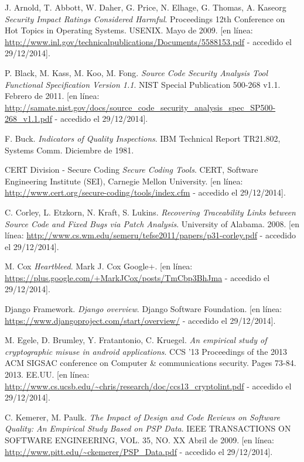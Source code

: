 \documentclass[11pt,a4paper]{article}
\begin{document}
\begin{thebibliography}{99}

	J. Arnold, T. Abbott, W. Daher, G. Price, N. Elhage, G. Thomas, A. Kaseorg
	\emph{Security Impact Ratings Considered Harmful}.
	Proceedings 12th Conference on Hot Topics in Operating Systems. USENIX.
	Mayo de 2009.
	[en línea: \url{http://www.inl.gov/technicalpublications/Documents/5588153.pdf} - accedido el 29/12/2014].

	P. Black, M. Kass, M. Koo, M. Fong.
	\emph{Source Code Security Analysis Tool Functional Specification Version 1.1}.
	NIST Special Publication 500-268 v1.1.
	Febrero de 2011. 
	[en línea: \url{http://samate.nist.gov/docs/source_code_security_analysis_spec_SP500-268_v1.1.pdf} - accedido el 29/12/2014].

	F. Buck.
	\emph{Indicators of Quality Inspections}.
	IBM Technical Report TR21.802, Systems Comm.
	Diciembre de 1981.

	CERT Division - Secure Coding
	\emph{Secure Coding Tools}.
	CERT, Software Engineering Institute (SEI), Carnegie Mellon University.
	[en línea: \url{http://www.cert.org/secure-coding/tools/index.cfm} - accedido el 29/12/2014].

	C. Corley, L. Etzkorn, N. Kraft, S. Lukins.
	\emph{Recovering Traceability Links between Source Code	and Fixed Bugs via Patch Analysis}.
	University of Alabama. 2008.
	[en línea: \url{http://www.cs.wm.edu/semeru/tefse2011/papers/p31-corley.pdf} - accedido el 29/12/2014].

	M. Cox
	\emph{Heartbleed}.
	Mark J. Cox Google+.
	[en línea: \url{https://plus.google.com/+MarkJCox/posts/TmCbp3BhJma} - accedido el 29/12/2014].

	Django Framework.
	\emph{Django overview}.
	Django Software Foundation.
	[en línea: \url{https://www.djangoproject.com/start/overview/} - accedido el 29/12/2014].

	 M. Egele, D. Brumley, Y. Fratantonio, C. Kruegel.
	\emph{An empirical study of cryptographic misuse in android applications}.
	CCS '13 Proceedings of the 2013 ACM SIGSAC conference on Computer \& communications security. Pages 73-84.
	2013. EE.UU.
	[en línea: \url{http://www.cs.ucsb.edu/~chris/research/doc/ccs13_cryptolint.pdf} - accedido el 29/12/2014].

	C. Kemerer, M. Paulk.
	\emph{The Impact of Design and Code Reviews on Software Quality: An Empirical Study Based on PSP Data}.
	IEEE TRANSACTIONS ON SOFTWARE ENGINEERING, VOL. 35, NO. XX
	Abril de 2009. 
	[en línea: \url{http://www.pitt.edu/~ckemerer/PSP_Data.pdf} - accedido el 29/12/2014].


\end{thebibliography}
\end{document}
